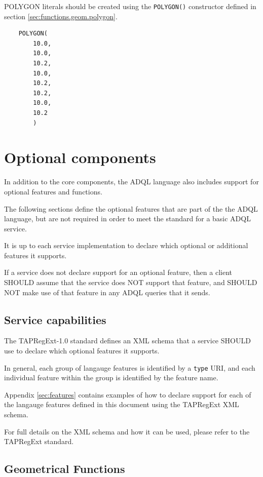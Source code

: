 \documentclass[11pt,a4paper]{ivoa}
\begin{document}
POLYGON literals should be created using the \verb:POLYGON():
constructor defined in section \ref{sec:functions.geom.polygon}.

\begin{verbatim}
    POLYGON(
        10.0,
        10.0,
        10.2,
        10.0,
        10.2,
        10.2,
        10.0,
        10.2
        )
\end{verbatim}

\clearpage
\section{Optional components}
\label{sec:optional}

In addition to the core components, the ADQL language also includes support
for optional features and functions.

The following sections define the optional features that are part of the
the ADQL language, but are not required in order to meet the standard for
a basic ADQL service.

It is up to each service implementation to declare which optional or
additional features it supports.

If a service does not declare support for an optional feature,
then a client SHOULD assume that the service does NOT support
that feature, and SHOULD NOT make use of that feature in any
ADQL queries that it sends.

\subsection{Service capabilities}
\label{sec:capabilities}

The TAPRegExt-1.0 standard \citep{std:TAPREGEXT} defines an XML schema that a service SHOULD
use to declare which optional features it supports.

In general, each group of langauge features is identified by a \verb:type:
URI, and each individual feature within the group is identified by the
feature name.

Appendix \ref{sec:features} contains examples of how to declare support
for each of the langauge features defined in this document using the
TAPRegExt XML schema.

For full details on the XML schema and how it can be used, please refer to
the TAPRegExt \citep{std:TAPREGEXT} standard.

\subsection{Geometrical Functions}
\label{sec:functions.geom}
\end{document}
